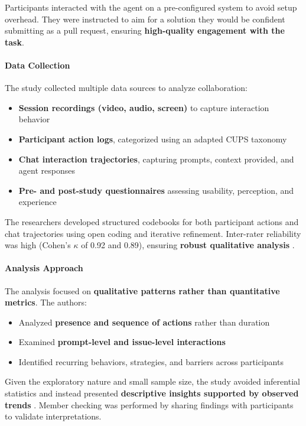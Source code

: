 Participants interacted with the agent on a pre-configured system to avoid setup overhead. They were instructed to aim for a solution they would be confident submitting as a pull request, ensuring \textbf{high-quality engagement with the task}.

\paragraph{Data Collection}

The study collected multiple data sources to analyze collaboration:
\begin{itemize}
    \item \textbf{Session recordings (video, audio, screen)} to capture interaction behavior
    \item \textbf{Participant action logs}, categorized using an adapted CUPS taxonomy \cite{mozannar2024reading}
    \item \textbf{Chat interaction trajectories}, capturing prompts, context provided, and agent responses
    \item \textbf{Pre- and post-study questionnaires} assessing usability, perception, and experience
\end{itemize}

The researchers developed structured codebooks for both participant actions and chat trajectories using open coding and iterative refinement.  Inter-rater reliability was high (Cohen's $\kappa$ of 0.92 and 0.89), ensuring \textbf{robust qualitative analysis} \cite{landis1977agreement}.

\paragraph{Analysis Approach}

The analysis focused on \textbf{qualitative patterns rather than quantitative metrics}. The authors:
\begin{itemize}
    \item Analyzed \textbf{presence and sequence of actions} rather than duration
    \item Examined \textbf{prompt-level and issue-level interactions}
    \item Identified recurring behaviors, strategies, and barriers across participants
\end{itemize}
Given the exploratory nature and small sample size, the study avoided inferential statistics and instead presented \textbf{descriptive insights supported by observed trends} \cite{motulsky2021memberchecking}.  Member checking was performed by sharing findings with participants to validate interpretations.

